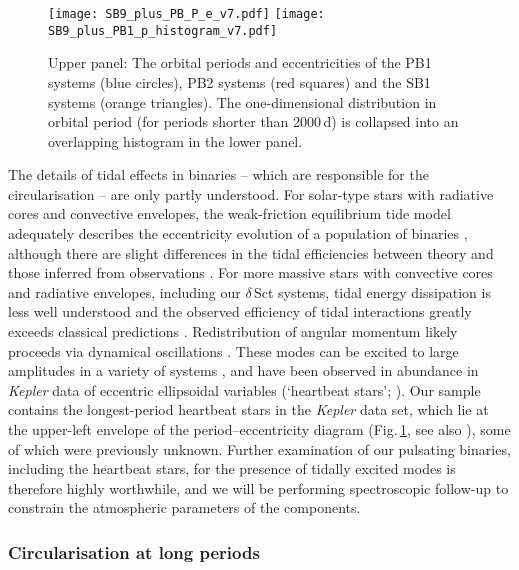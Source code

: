 \documentclass[a4paper,fleqn,usenatbib]{mnras}
\begin{document}
\begin{figure}
\begin{center}
\texttt{[image: SB9\_plus\_PB\_P\_e\_v7.pdf]}
\texttt{[image: SB9\_plus\_PB1\_p\_histogram\_v7.pdf]}
\caption{Upper panel: The orbital periods and eccentricities of the PB1 systems (blue circles), PB2 systems (red squares) and the SB1 systems (orange triangles). The one-dimensional distribution in orbital period (for periods shorter than 2000\,d) is collapsed into an overlapping histogram in the lower panel.}
\label{fig:pe}
\end{center}
\end{figure}


The details of tidal effects in binaries -- which are responsible for the circularisation -- are only partly understood. For solar-type stars with radiative cores and convective envelopes, the weak-friction equilibrium tide model adequately describes the eccentricity evolution of a population of binaries \citep{zahn1977,hut1981}, although there are slight differences in the tidal efficiencies between theory and those inferred from observations \citep{meibom&mathieu2005,belczynskietal2008,moe&kratter2017}. For more massive stars with convective cores and radiative envelopes, including our $\delta$\,Sct systems, tidal energy dissipation is less well understood and the observed efficiency of tidal interactions \citep{abt&boonyarak2004} greatly exceeds classical predictions \citep{zahn1975,zahn1984,tassoul&tassoul1992a}. Redistribution of angular momentum likely proceeds via dynamical oscillations \citep{zahn1975,witte&savonije2001,fuller2017}. These modes can be excited to large amplitudes in a variety of systems \citep{fuller&lai2011,fulleretal2013,hambletonetal2015}, and have been observed in abundance in \textit{Kepler} data of eccentric ellipsoidal variables (`heartbeat stars'; \citealt{thompsonetal2012}). Our sample contains the longest-period heartbeat stars in the \textit{Kepler} data set, which lie at the upper-left envelope of the period--eccentricity diagram (Fig.\,\ref{fig:pe}, see also \citealt{shporeretal2016}), some of which were previously unknown. Further examination of our pulsating binaries, including the heartbeat stars, for the presence of tidally excited modes is therefore highly worthwhile, and we will be performing spectroscopic follow-up to constrain the atmospheric parameters of the components.


\subsubsection{Circularisation at long periods}
\end{document}
